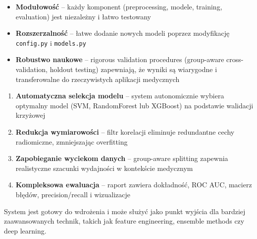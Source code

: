 \documentclass[12pt]{article}
\begin{document}
\begin{itemize}
    \item \textbf{Modułowość} – każdy komponent (preprocessing, modele, training, evaluation) jest niezależny i łatwo testowany
    \item \textbf{Rozszerzalność} – łatwe dodanie nowych modeli poprzez modyfikację \texttt{config.py} i \texttt{models.py}
    \item \textbf{Robustwo naukowe} – rigorous validation procedures (group-aware cross-validation, holdout testing) zapewniają, że wyniki są wiarygodne i transferowalne do rzeczywistych aplikacji medycznych
\end{itemize}

\begin{tcolorbox}[colframe=black!75!black, colback=gray!10, title={\large Kluczowe osiągnięcia}, fonttitle=\bfseries]
\begin{enumerate}
    \item \textbf{Automatyczna selekcja modelu} – system autonomicznie wybiera optymalny model (SVM, RandomForest lub XGBoost) na podstawie walidacji krzyżowej
    \item \textbf{Redukcja wymiarowości} – filtr korelacji eliminuje redundantne cechy radiomiczne, zmniejszając overfitting
    \item \textbf{Zapobieganie wyciekom danych} – group-aware splitting zapewnia realistyczne szacunki wydajności w kontekście medycznym
    \item \textbf{Kompleksowa ewaluacja} – raport zawiera dokładność, ROC AUC, macierz błędów, precision/recall i wizualizacje
\end{enumerate}
\end{tcolorbox}

\vspace{1cm}
\noindent
System jest gotowy do wdrożenia i może służyć jako punkt wyjścia dla bardziej zaawansowanych technik, takich jak feature engineering, ensemble methods czy deep learning.
\end{document}
